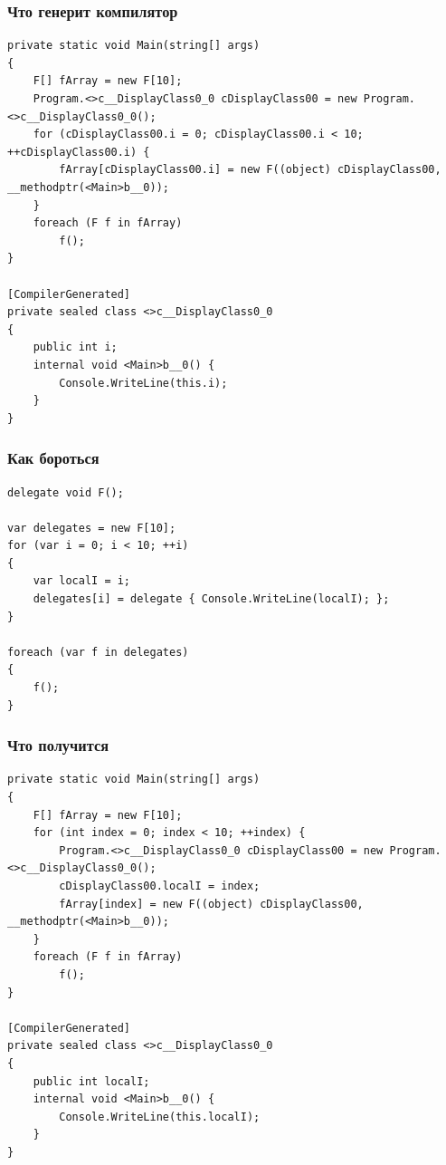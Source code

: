 \documentclass{../../slides-style}
\begin{document}
    \begin{frame}[fragile]
        \frametitle{Что генерит компилятор}
        \begin{scriptsize}
            \begin{verbatim}
private static void Main(string[] args)
{
    F[] fArray = new F[10];
    Program.<>c__DisplayClass0_0 cDisplayClass00 = new Program.<>c__DisplayClass0_0();
    for (cDisplayClass00.i = 0; cDisplayClass00.i < 10; ++cDisplayClass00.i) {
        fArray[cDisplayClass00.i] = new F((object) cDisplayClass00, __methodptr(<Main>b__0));
    }
    foreach (F f in fArray)
        f();
}

[CompilerGenerated]
private sealed class <>c__DisplayClass0_0
{
    public int i;
    internal void <Main>b__0() {
        Console.WriteLine(this.i);
    }
}
            \end{verbatim}
        \end{scriptsize}
    \end{frame}

    \begin{frame}[fragile]
        \frametitle{Как бороться}
        \begin{small}
            \begin{verbatim}
delegate void F();

var delegates = new F[10];
for (var i = 0; i < 10; ++i)
{
    var localI = i;
    delegates[i] = delegate { Console.WriteLine(localI); };
}

foreach (var f in delegates)
{
    f();
}
            \end{verbatim}
        \end{small}
    \end{frame}

    \begin{frame}[fragile]
        \frametitle{Что получится}
        \begin{scriptsize}
            \begin{verbatim}
private static void Main(string[] args)
{
    F[] fArray = new F[10];
    for (int index = 0; index < 10; ++index) {
        Program.<>c__DisplayClass0_0 cDisplayClass00 = new Program.<>c__DisplayClass0_0();
        cDisplayClass00.localI = index;
        fArray[index] = new F((object) cDisplayClass00, __methodptr(<Main>b__0));
    }
    foreach (F f in fArray)
        f();
}

[CompilerGenerated]
private sealed class <>c__DisplayClass0_0
{
    public int localI;
    internal void <Main>b__0() {
        Console.WriteLine(this.localI);
    }
}
            \end{verbatim}
        \end{scriptsize}
    \end{frame}
\end{document}

